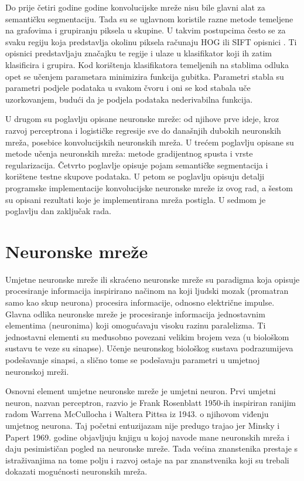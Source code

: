 \documentclass[times, utf8, diplomski, numeric]{fer}
\begin{document}
Do prije četiri godine godine konvolucijske mreže nisu bile glavni alat za semantičku segmentaciju. Tada su se uglavnom koristile razne metode temeljene na grafovima i grupiranju piksela u skupine. U takvim postupcima često se za svaku regiju koja predstavlja okolinu piksela računaju HOG  ili SIFT  opisnici \cite{Lowe:1999}. Ti opisnici predstavljaju značajku te regije i ulaze u klasifikator koji ih zatim klasificira i grupira.
Kod korištenja klasifikatora temeljenih na stablima odluka opet se učenjem parametara minimizira funkcija gubitka. Parametri stabla su parametri podjele podataka u svakom čvoru  i oni se kod stabala uče uzorkovanjem, budući da je podjela podataka nederivabilna funkcija.

U drugom su poglavlju opisane neuronske mreže: od njihove prve ideje, kroz razvoj perceptrona i logističke regresije sve do današnjih dubokih neuronskih mreža, posebice konvolucijskih neuronskih mreža. U trećem poglavlju opisane su metode učenja neuronskih mreža: metode gradijentnog spusta i vrste regularizacija. Četvrto poglavlje opisuje pojam semantičke segmentacija i korištene testne skupove podataka. U petom se poglavlju opisuju detalji programske implementacije konvolucijske neuronske mreže iz ovog rad, a šestom su opisani rezultati koje je implementirana mreža postigla. U sedmom je poglavlju dan zaključak rada.

\chapter{Neuronske mreže}

Umjetne neuronske mreže  ili skraćeno neuronske mreže su paradigma koja opisuje procesiranje informacija inspirirano načinom na koji ljudski mozak (promatran samo kao skup neurona) procesira informacije, odnosno električne impulse. Glavna odlika neuronske mreže je procesiranje informacija jednostavnim elementima (neuronima) koji omogućavaju visoku razinu paralelizma. Ti jednostavni elementi su međusobno povezani velikim brojem veza (u biološkom sustavu te veze su sinapse). Učenje neuronskog biološkog sustava podrazumijeva podešavanje sinapsi, a slično tome se podešavaju parametri u umjetnoj neuronskoj mreži.

Osnovni element umjetne neuronske mreže je umjetni neuron. Prvi umjetni neuron, nazvan perceptron, razvio je Frank Rosenblatt 1950-ih inspiriran ranijim radom \cite{mcculloch43a}  Warrena  McCullocha i Waltera Pittsa iz 1943. o njihovom viđenju umjetnog neurona. Taj početni entuzijazam nije predugo trajao jer Minsky i Papert 1969. godine objavljuju knjigu \cite{minsky69perceptrons} u kojoj navode mane neuronskih mreža i daju pesimističan pogled na neuronske mreže. Tada većina znanstenika prestaje s istraživanjima na tome polju i razvoj ostaje na par znanstvenika koji su trebali dokazati mogućnosti neuronskih mreža.
\end{document}
